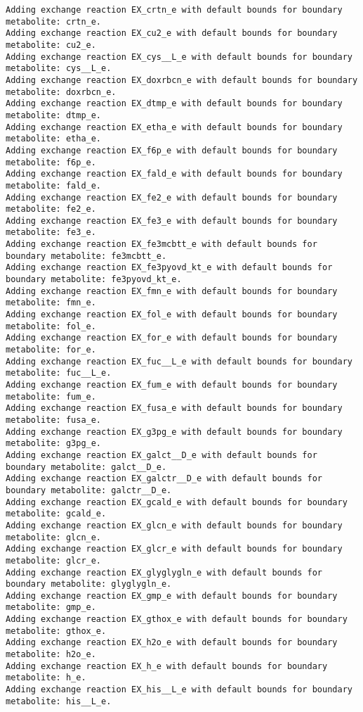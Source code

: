 \documentclass[
  letterpaper,
  DIV=11,
  numbers=noendperiod]{scrartcl}
\begin{document}
\begin{verbatim}
Adding exchange reaction EX_crtn_e with default bounds for boundary metabolite: crtn_e.
Adding exchange reaction EX_cu2_e with default bounds for boundary metabolite: cu2_e.
Adding exchange reaction EX_cys__L_e with default bounds for boundary metabolite: cys__L_e.
Adding exchange reaction EX_doxrbcn_e with default bounds for boundary metabolite: doxrbcn_e.
Adding exchange reaction EX_dtmp_e with default bounds for boundary metabolite: dtmp_e.
Adding exchange reaction EX_etha_e with default bounds for boundary metabolite: etha_e.
Adding exchange reaction EX_f6p_e with default bounds for boundary metabolite: f6p_e.
Adding exchange reaction EX_fald_e with default bounds for boundary metabolite: fald_e.
Adding exchange reaction EX_fe2_e with default bounds for boundary metabolite: fe2_e.
Adding exchange reaction EX_fe3_e with default bounds for boundary metabolite: fe3_e.
Adding exchange reaction EX_fe3mcbtt_e with default bounds for boundary metabolite: fe3mcbtt_e.
Adding exchange reaction EX_fe3pyovd_kt_e with default bounds for boundary metabolite: fe3pyovd_kt_e.
Adding exchange reaction EX_fmn_e with default bounds for boundary metabolite: fmn_e.
Adding exchange reaction EX_fol_e with default bounds for boundary metabolite: fol_e.
Adding exchange reaction EX_for_e with default bounds for boundary metabolite: for_e.
Adding exchange reaction EX_fuc__L_e with default bounds for boundary metabolite: fuc__L_e.
Adding exchange reaction EX_fum_e with default bounds for boundary metabolite: fum_e.
Adding exchange reaction EX_fusa_e with default bounds for boundary metabolite: fusa_e.
Adding exchange reaction EX_g3pg_e with default bounds for boundary metabolite: g3pg_e.
Adding exchange reaction EX_galct__D_e with default bounds for boundary metabolite: galct__D_e.
Adding exchange reaction EX_galctr__D_e with default bounds for boundary metabolite: galctr__D_e.
Adding exchange reaction EX_gcald_e with default bounds for boundary metabolite: gcald_e.
Adding exchange reaction EX_glcn_e with default bounds for boundary metabolite: glcn_e.
Adding exchange reaction EX_glcr_e with default bounds for boundary metabolite: glcr_e.
Adding exchange reaction EX_glyglygln_e with default bounds for boundary metabolite: glyglygln_e.
Adding exchange reaction EX_gmp_e with default bounds for boundary metabolite: gmp_e.
Adding exchange reaction EX_gthox_e with default bounds for boundary metabolite: gthox_e.
Adding exchange reaction EX_h2o_e with default bounds for boundary metabolite: h2o_e.
Adding exchange reaction EX_h_e with default bounds for boundary metabolite: h_e.
Adding exchange reaction EX_his__L_e with default bounds for boundary metabolite: his__L_e.

\end{verbatim}
\end{document}
